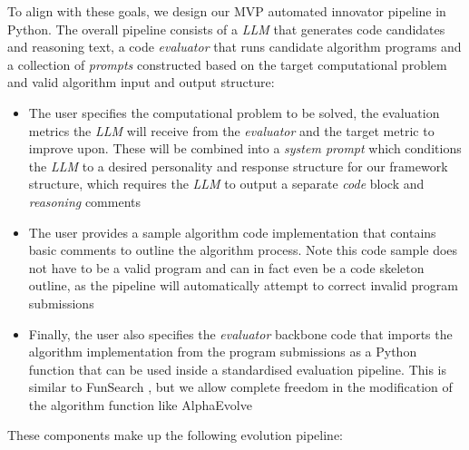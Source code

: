 \documentclass[12pt, legalpaper]{article}
\begin{document}
To align with these goals, we design our MVP automated innovator pipeline in Python. 
The overall pipeline consists of a \emph{LLM} that generates code candidates and reasoning text, a code \emph{evaluator} that runs candidate algorithm programs and a collection of \emph{prompts} constructed based on the target computational problem and valid algorithm input and output structure: 
%
\begin{itemize}
    \item The user specifies the computational problem to be solved, the evaluation metrics the \emph{LLM} will receive from the \emph{evaluator} and the target metric to improve upon. These will be combined into a \emph{system prompt} which conditions the \emph{LLM} to a desired personality and response structure for our framework structure, which requires the \emph{LLM} to output a separate \emph{code} block and \emph{reasoning} comments

    \item The user provides a sample algorithm code implementation that contains basic comments to outline the algorithm process. Note this code sample does not have to be a valid program and can in fact even be a code skeleton outline, as the pipeline will automatically attempt to correct invalid program submissions

    \item Finally, the user also specifies the \emph{evaluator} backbone code that imports the algorithm implementation from the program submissions as a Python function that can be used inside a standardised evaluation pipeline. This is similar to FunSearch \citep{romera2024mathematical}, but we allow complete freedom in the modification of the algorithm function like AlphaEvolve \citep{novikov2025alphaevolve}
\end{itemize}
%
These components make up the following evolution pipeline: 
%
\end{document}
